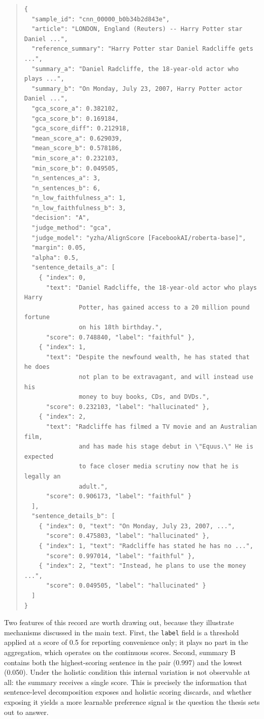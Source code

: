 \begin{quote}
\footnotesize
\begin{verbatim}
{
  "sample_id": "cnn_00000_b0b34b2d843e",
  "article": "LONDON, England (Reuters) -- Harry Potter star Daniel ...",
  "reference_summary": "Harry Potter star Daniel Radcliffe gets ...",
  "summary_a": "Daniel Radcliffe, the 18-year-old actor who plays ...",
  "summary_b": "On Monday, July 23, 2007, Harry Potter actor Daniel ...",
  "gca_score_a": 0.382102,
  "gca_score_b": 0.169184,
  "gca_score_diff": 0.212918,
  "mean_score_a": 0.629039,
  "mean_score_b": 0.578186,
  "min_score_a": 0.232103,
  "min_score_b": 0.049505,
  "n_sentences_a": 3,
  "n_sentences_b": 6,
  "n_low_faithfulness_a": 1,
  "n_low_faithfulness_b": 3,
  "decision": "A",
  "judge_method": "gca",
  "judge_model": "yzha/AlignScore [FacebookAI/roberta-base]",
  "margin": 0.05,
  "alpha": 0.5,
  "sentence_details_a": [
    { "index": 0,
      "text": "Daniel Radcliffe, the 18-year-old actor who plays Harry
               Potter, has gained access to a 20 million pound fortune
               on his 18th birthday.",
      "score": 0.748840, "label": "faithful" },
    { "index": 1,
      "text": "Despite the newfound wealth, he has stated that he does
               not plan to be extravagant, and will instead use his
               money to buy books, CDs, and DVDs.",
      "score": 0.232103, "label": "hallucinated" },
    { "index": 2,
      "text": "Radcliffe has filmed a TV movie and an Australian film,
               and has made his stage debut in \"Equus.\" He is expected
               to face closer media scrutiny now that he is legally an
               adult.",
      "score": 0.906173, "label": "faithful" }
  ],
  "sentence_details_b": [
    { "index": 0, "text": "On Monday, July 23, 2007, ...",
      "score": 0.475803, "label": "hallucinated" },
    { "index": 1, "text": "Radcliffe has stated he has no ...",
      "score": 0.997014, "label": "faithful" },
    { "index": 2, "text": "Instead, he plans to use the money ...",
      "score": 0.049505, "label": "hallucinated" }
  ]
}
\end{verbatim}
\end{quote}

Two features of this record are worth drawing out, because they illustrate
mechanisms discussed in the main text. First, the \texttt{label} field is a
threshold applied at a score of 0.5 for reporting convenience only; it plays no
part in the aggregation, which operates on the continuous scores. Second, summary
B contains both the highest-scoring sentence in the pair (0.997) and the
lowest (0.050). Under the holistic condition this internal variation is not
observable at all: the summary receives a single score. This is precisely the
information that sentence-level decomposition exposes and holistic scoring
discards, and whether exposing it yields a more learnable preference signal is the
question the thesis sets out to answer.
